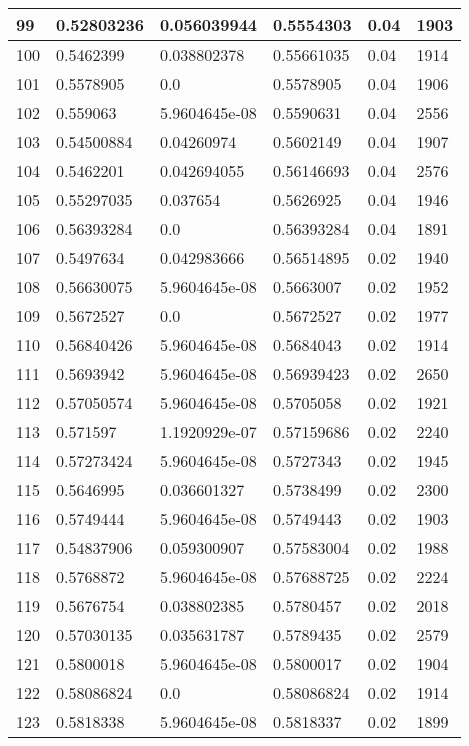 \begin{longtable}{|l|l|l|l|l|l|}
99 & 0.52803236 & 0.056039944 & 0.5554303 & 0.04 & 1903 \\ \hline 
100 & 0.5462399 & 0.038802378 & 0.55661035 & 0.04 & 1914 \\ \hline 
101 & 0.5578905 & 0.0 & 0.5578905 & 0.04 & 1906 \\ \hline 
102 & 0.559063 & 5.9604645e-08 & 0.5590631 & 0.04 & 2556 \\ \hline 
103 & 0.54500884 & 0.04260974 & 0.5602149 & 0.04 & 1907 \\ \hline 
104 & 0.5462201 & 0.042694055 & 0.56146693 & 0.04 & 2576 \\ \hline 
105 & 0.55297035 & 0.037654 & 0.5626925 & 0.04 & 1946 \\ \hline 
106 & 0.56393284 & 0.0 & 0.56393284 & 0.04 & 1891 \\ \hline 
107 & 0.5497634 & 0.042983666 & 0.56514895 & 0.02 & 1940 \\ \hline 
108 & 0.56630075 & 5.9604645e-08 & 0.5663007 & 0.02 & 1952 \\ \hline 
109 & 0.5672527 & 0.0 & 0.5672527 & 0.02 & 1977 \\ \hline 
110 & 0.56840426 & 5.9604645e-08 & 0.5684043 & 0.02 & 1914 \\ \hline 
111 & 0.5693942 & 5.9604645e-08 & 0.56939423 & 0.02 & 2650 \\ \hline 
112 & 0.57050574 & 5.9604645e-08 & 0.5705058 & 0.02 & 1921 \\ \hline 
113 & 0.571597 & 1.1920929e-07 & 0.57159686 & 0.02 & 2240 \\ \hline 
114 & 0.57273424 & 5.9604645e-08 & 0.5727343 & 0.02 & 1945 \\ \hline 
115 & 0.5646995 & 0.036601327 & 0.5738499 & 0.02 & 2300 \\ \hline 
116 & 0.5749444 & 5.9604645e-08 & 0.5749443 & 0.02 & 1903 \\ \hline 
117 & 0.54837906 & 0.059300907 & 0.57583004 & 0.02 & 1988 \\ \hline 
118 & 0.5768872 & 5.9604645e-08 & 0.57688725 & 0.02 & 2224 \\ \hline 
119 & 0.5676754 & 0.038802385 & 0.5780457 & 0.02 & 2018 \\ \hline 
120 & 0.57030135 & 0.035631787 & 0.5789435 & 0.02 & 2579 \\ \hline 
121 & 0.5800018 & 5.9604645e-08 & 0.5800017 & 0.02 & 1904 \\ \hline 
122 & 0.58086824 & 0.0 & 0.58086824 & 0.02 & 1914 \\ \hline 
123 & 0.5818338 & 5.9604645e-08 & 0.5818337 & 0.02 & 1899 \\ \hline 

\end{longtable}

